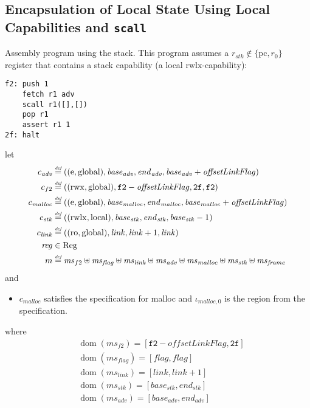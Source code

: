 \documentclass[a4paper]{article}
\newcommand{\defeq}{\stackrel{\textit{\tiny{def}}}{=}}
\DeclareMathOperator{\dom}{dom}
\newcommand{\var}[1]{\mathit{#1}}
\newcommand{\hs}{\var{ms}}
\newcommand{\ms}{\hs}
\newcommand{\pcreg}{\mathrm{pc}}
\newcommand{\start}{\var{base}}
\newcommand{\addrend}{\var{end}}
\newcommand{\reg}{\var{reg}}
\newcommand{\adv}{\var{adv}}
\newcommand{\link}{\var{link}}
\newcommand{\stk}{\var{stk}}
\newcommand{\flag}{\var{flag}}
\newcommand{\olf}{\var{offsetLinkFlag}}
\newcommand{\codelabel}[1]{\mathit{#1}}
\newcommand{\malloc}{\codelabel{malloc}}
\newcommand{\plaindom}[1]{\mathrm{#1}}
\newcommand{\Regs}{\plaindom{Reg}}
\newcommand{\plainperm}[1]{\mathrm{#1}}
\newcommand{\readonly}{\plainperm{ro}}
\newcommand{\entry}{\plainperm{e}}
\newcommand{\rwx}{\plainperm{rwx}}
\newcommand{\rwlx}{\plainperm{rwlx}}
\newcommand{\local}{\plainperm{local}}
\newcommand{\glob}{\plainperm{global}}
\begin{document}
\subsection{Encapsulation of Local State Using Local Capabilities and \texttt{scall}}
\label{subsec:example-loc-cap}

Assembly program using the stack. This program assumes a $r_\stk \not\in \{\pcreg,r_0\}$ register that contains a stack capability (a local $\rwlx$-capability):
\begin{verbatim}
f2: push 1
    fetch r1 adv
    scall r1([],[])
    pop r1
    assert r1 1
2f: halt
\end{verbatim}
              
\begin{lemma}
  \label{lem:correctness-f2}
  let
  \begin{align*}
    c_{\var{adv}} & \defeq ((\entry,\glob),\start_{\adv},\addrend_{\adv},\start_{\adv}+\olf) \\
    c_{f2} & \defeq ((\rwx,\glob),\mathtt{f2}-\olf,\mathtt{2f},\mathtt{f2}) \\
    c_\malloc & \defeq ((\entry,\glob),\start_\malloc,\addrend_\malloc,\start_\malloc+\olf) \\
    c_{\var{stk}} & \defeq ((\rwlx,\local),\start_\stk,\addrend_\stk,\start_\stk-1) \\
    c_\link & \defeq ((\readonly,\glob),\link,\link+1,\link)\\
    \reg & \in \Regs \\
    m & \defeq \hs_{f2} \uplus 
        \hs_\flag \uplus                
        \ms_{\var{link}} \uplus 
        \hs_\adv \uplus 
        \ms_{\malloc} \uplus 
        \ms_{\var{stk}} \uplus
        \ms_{\var{frame}} 
  \end{align*}
  and
  \begin{itemize}
  \item $c_\malloc$ satisfies the specification for malloc and $\iota_{\malloc,0}$ is the region from the specification.
  \end{itemize}
  where 
  \begin{align*}
    &\dom(\hs_{f2}) = [\mathtt{f2}-\olf,\mathtt{2f}] \\
    &\dom(\hs_\flag) = [\flag,\flag] \\
    &\dom(\ms_\link) = [\link,\link+1]\\
    &\dom(\ms_\stk) = [\start_\stk, \addrend_\stk]\\
    &\dom(\hs_{\adv}) = [\start_\adv,\addrend_\adv] \\

\end{align*}
\end{lemma}
\end{document}
